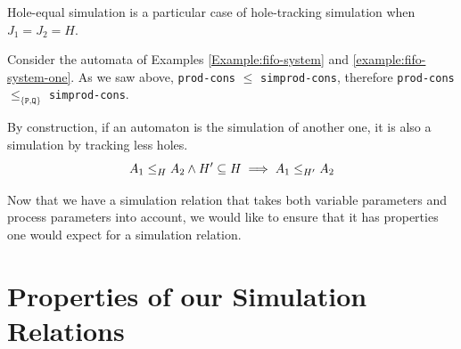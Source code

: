 \documentclass[runningheads]{llncs}
\newcommand{\xrightarrowdbl}[2][]{%
  \xrightarrow[#1]{#2}\mathrel{\mkern-14mu}\rightarrow
}
\begin{document}
\begin{property}\label{lem-sim-sim}
Hole-equal simulation is a particular case of hole-tracking simulation when  $J_1=J_2=H$.
\end{property}
\begin{example} Consider the automata of Examples \ref{Example:fifo-system} and \ref{example:fifo-system-one}. As we saw above, \texttt{prod-cons} $\leq$ \texttt{simprod-cons}, therefore \texttt{prod-cons} $\leq_{\{\texttt{P,Q}\}}$ \texttt{simprod-cons}.
\end{example}



%
%

\begin{property} By construction, if an automaton is the simulation of another one, it is also a simulation by tracking less holes.
\[\wrel{A_1}{A_2}{H} \land H'\subseteq H \implies \wrel{A_1}{A_2}{H'}\]
\end{property}

Now that we have a simulation relation that takes both variable parameters and process parameters into account, we would like to ensure that it has  properties one would expect for a simulation relation.

\section{Properties of our Simulation Relations}\label{sec:prop}
\end{document}
